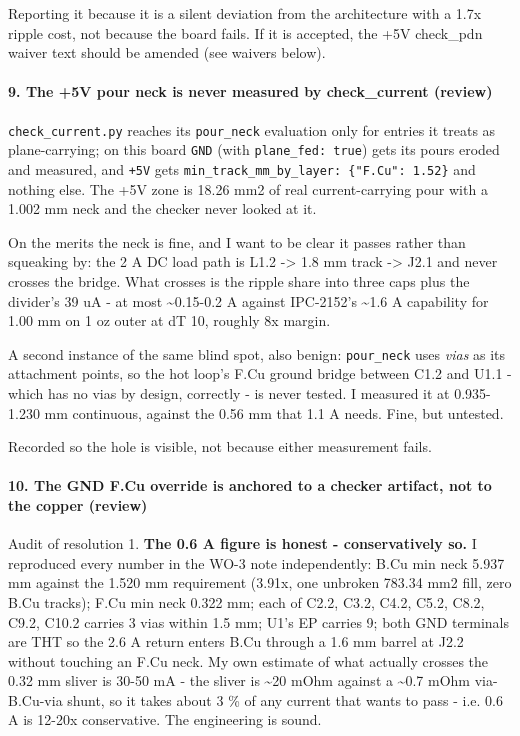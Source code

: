 \documentclass[11pt,a4paper]{article}
\begin{document}
Reporting it because it is a silent deviation from the architecture with a 1.7x ripple cost, not because the board fails. If it is accepted, the +5V check\_pdn waiver text should be amended (see waivers below).

\paragraph*{9. The +5V pour neck is never measured by check\_current (review)}
\texttt{check\_current.py} reaches its \texttt{pour\_neck} evaluation only for entries it treats as plane-carrying; on this board \texttt{GND} (with \texttt{plane\_fed: true}) gets its pours eroded and measured, and \texttt{+5V} gets \texttt{min\_track\_mm\_by\_layer: \{"F.Cu": 1.52\}} and nothing else. The +5V zone is 18.26 mm2 of real current-carrying pour with a 1.002 mm neck and the checker never looked at it.

On the merits the neck is fine, and I want to be clear it passes rather than squeaking by: the 2 A DC load path is L1.2 -\textgreater{} 1.8 mm track -\textgreater{} J2.1 and never crosses the bridge. What crosses is the ripple share into three caps plus the divider's 39 uA - at most \textasciitilde{}0.15-0.2 A against IPC-2152's \textasciitilde{}1.6 A capability for 1.00 mm on 1 oz outer at dT 10, roughly 8x margin.

A second instance of the same blind spot, also benign: \texttt{pour\_neck} uses \emph{vias} as its attachment points, so the hot loop's F.Cu ground bridge between C1.2 and U1.1 - which has no vias by design, correctly - is never tested. I measured it at 0.935-1.230 mm continuous, against the 0.56 mm that 1.1 A needs. Fine, but untested.

Recorded so the hole is visible, not because either measurement fails.

\paragraph*{10. The GND F.Cu override is anchored to a checker artifact, not to the copper (review)}
Audit of resolution 1. \textbf{The 0.6 A figure is honest - conservatively so.} I reproduced every number in the WO-3 note independently: B.Cu min neck 5.937 mm against the 1.520 mm requirement (3.91x, one unbroken 783.34 mm2 fill, zero B.Cu tracks); F.Cu min neck 0.322 mm; each of C2.2, C3.2, C4.2, C5.2, C8.2, C9.2, C10.2 carries 3 vias within 1.5 mm; U1's EP carries 9; both GND terminals are THT so the 2.6 A return enters B.Cu through a 1.6 mm barrel at J2.2 without touching an F.Cu neck. My own estimate of what actually crosses the 0.32 mm sliver is 30-50 mA - the sliver is \textasciitilde{}20 mOhm against a \textasciitilde{}0.7 mOhm via-B.Cu-via shunt, so it takes about 3 \% of any current that wants to pass - i.e. 0.6 A is 12-20x conservative. The engineering is sound.
\end{document}
